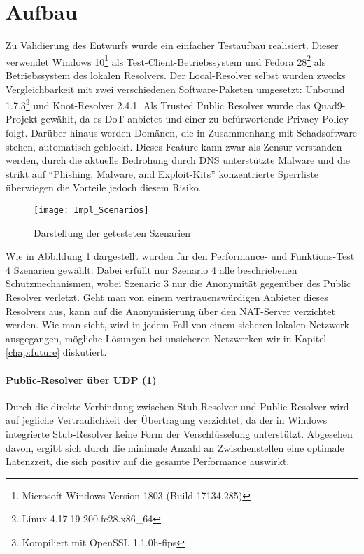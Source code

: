 \section{Aufbau}
\label{sec:architecture}
Zu Validierung des Entwurfs wurde ein einfacher Testaufbau realisiert. Dieser verwendet Windows 10\footnote{Microsoft Windows Version 1803 (Build 17134.285)} als Test-Client-Betriebssystem und Fedora 28\footnote{Linux 4.17.19-200.fc28.x86\_64} als Betriebssystem des lokalen Resolvers. Der Local-Resolver selbst wurden zwecks Vergleichbarkeit mit zwei verschiedenen Software-Paketen umgesetzt: Unbound 1.7.3\footnote{Kompiliert mit OpenSSL 1.1.0h-fips} und Knot-Resolver 2.4.1. Als Trusted Public Resolver wurde das Quad9-Projekt gewählt, da es DoT anbietet und einer zu befürwortende Privacy-Policy\cite{Quad9Privacy} folgt. Darüber hinaus werden Domänen, die in Zusammenhang mit Schadsoftware stehen, automatisch geblockt. Dieses Feature kann zwar als Zensur verstanden werden, durch die aktuelle Bedrohung durch DNS unterstützte Malware \cite{Alcoy2017} und die strikt auf ``Phishing, Malware, and Exploit-Kits'' konzentrierte Sperrliste\cite{Quad9FAQ} überwiegen die Vorteile jedoch diesem Risiko.   

\begin{figure}[!hb]
    \centering
    \texttt{[image: Impl\_Scenarios]}
    \caption{Darstellung der getesteten Szenarien}
    \label{img:impl-scenarios}
\end{figure}

Wie in Abbildung \ref{img:impl-scenarios} dargestellt wurden für den Performance- und Funktions-Test 4 Szenarien gewählt. Dabei erfüllt nur Szenario 4 alle beschriebenen Schutzmechanismen, wobei Szenario 3 nur die Anonymität gegenüber des Public Resolver verletzt. Geht man von einem vertrauenswürdigen Anbieter dieses Resolvers aus, kann auf die Anonymisierung über den NAT-Server verzichtet werden. Wie man sieht, wird in jedem Fall von einem sicheren lokalen Netzwerk ausgegangen, mögliche Lösungen bei unsicheren Netzwerken wir in Kapitel \ref{chap:future} diskutiert. 

\paragraph{Public-Resolver über UDP (1)}
Durch die direkte Verbindung zwischen Stub-Resolver und Public Resolver wird auf jegliche Vertraulichkeit der Übertragung verzichtet, da der in Windows integrierte Stub-Resolver keine Form der Verschlüsselung unterstützt. Abgesehen davon, ergibt sich durch die minimale Anzahl an Zwischenstellen eine optimale Latenzzeit, die sich positiv auf die gesamte Performance auswirkt.


